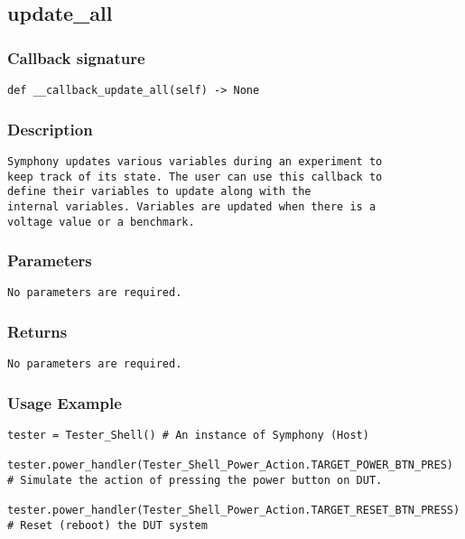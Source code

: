 \subsection{update\_all}

\subsubsection{Callback signature}
\begin{lstlisting}
def __callback_update_all(self) -> None
\end{lstlisting}

\subsubsection{Description}
\begin{lstlisting}[mathescape=true, keywordstyle=\color{black}, showstringspaces=false]
Symphony updates various variables during an experiment to 
keep track of its state. The user can use this callback to 
define their variables to update along with the 
internal variables. Variables are updated when there is a 
voltage value or a benchmark.
\end{lstlisting}

\subsubsection{Parameters}
\begin{lstlisting}[mathescape=true, keywordstyle=\color{black}]
No parameters are required.
\end{lstlisting}

\subsubsection{Returns}
\begin{lstlisting}[mathescape=true, keywordstyle=\color{black}]
No parameters are required.
\end{lstlisting}


\subsubsection{Usage Example}
\begin{lstlisting}
tester = Tester_Shell() # An instance of Symphony (Host)

tester.power_handler(Tester_Shell_Power_Action.TARGET_POWER_BTN_PRES) # Simulate the action of pressing the power button on DUT.

tester.power_handler(Tester_Shell_Power_Action.TARGET_RESET_BTN_PRESS) # Reset (reboot) the DUT system
\end{lstlisting}
